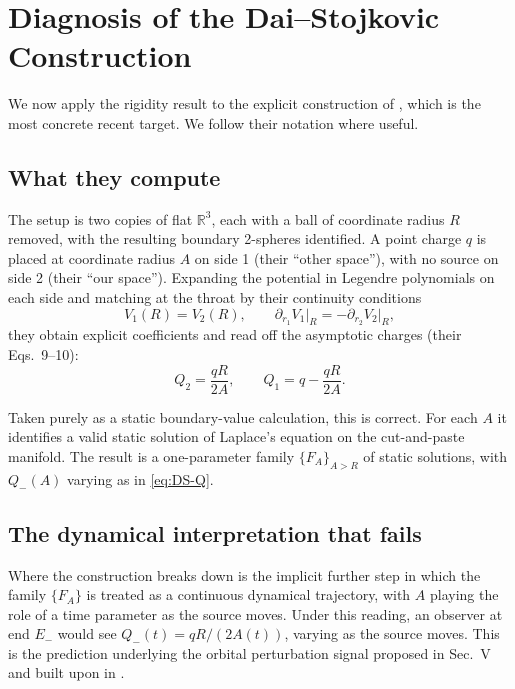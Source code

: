 \documentclass[aps,prd,onecolumn,nofootinbib,superscriptaddress]{revtex4-2}
\begin{document}
\section{Diagnosis of the Dai--Stojkovic Construction}
\label{sec:ds-diagnosis}

We now apply the rigidity result to the explicit construction of \cite{DaiStojkovic2019Observing}, which is the most concrete recent target. We follow their notation where useful.

\subsection{What they compute}

The setup is two copies of flat $\mathbb{R}^3$, each with a ball of coordinate radius $R$ removed, with the resulting boundary 2-spheres identified. A point charge $q$ is placed at coordinate radius $A$ on side 1 (their ``other space''), with no source on side 2 (their ``our space''). Expanding the potential in Legendre polynomials on each side and matching at the throat by their continuity conditions
\begin{equation}
V_1(R) = V_2(R), \qquad \partial_{r_1} V_1\big|_R = -\partial_{r_2} V_2\big|_R,
\end{equation}
they obtain explicit coefficients and read off the asymptotic charges (their Eqs.~9--10):
\begin{equation}
\label{eq:DS-Q}
Q_2 = \frac{qR}{2A}, \qquad Q_1 = q - \frac{qR}{2A}.
\end{equation}

Taken purely as a static boundary-value calculation, this is correct. For each $A$ it identifies a valid static solution of Laplace's equation on the cut-and-paste manifold. The result is a one-parameter family $\{F_A\}_{A>R}$ of static solutions, with $Q_-(A)$ varying as in \eqref{eq:DS-Q}.

\subsection{The dynamical interpretation that fails}

Where the construction breaks down is the implicit further step in which the family $\{F_A\}$ is treated as a continuous dynamical trajectory, with $A$ playing the role of a time parameter as the source moves. Under this reading, an observer at end $E_-$ would see $Q_-(t) = qR/(2A(t))$, varying as the source moves. This is the prediction underlying the orbital perturbation signal proposed in \cite{DaiStojkovic2019Observing} Sec.~V and built upon in \cite{SimonettiEtAl2021SensitiveSearches}.
\end{document}
